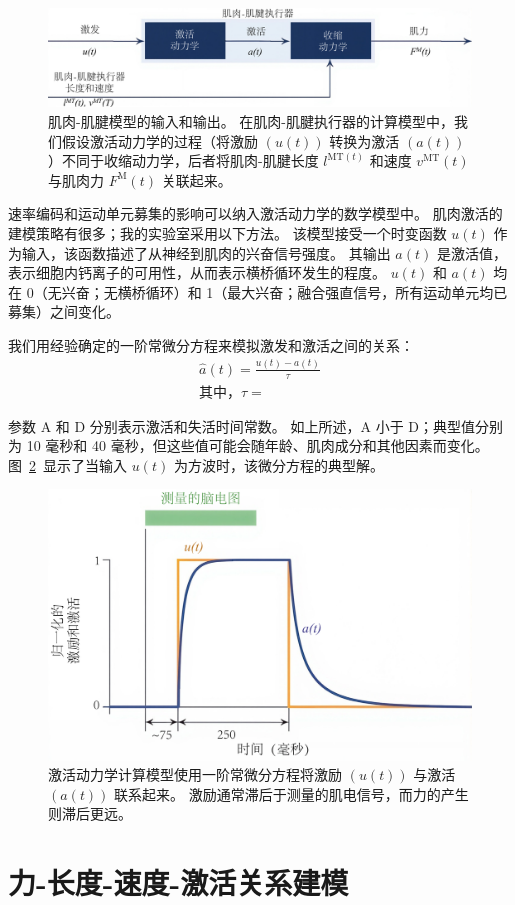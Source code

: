 \begin{figure}[!htb]
	\centering
	\includegraphics[width=1.0\linewidth]{chap4/4_15}
	\caption{肌肉-肌腱模型的输入和输出。
		在肌肉-肌腱执行器的计算模型中，我们假设激活动力学的过程（将激励 $(u(t))$  转换为激活 $(a(t))$）不同于收缩动力学，后者将肌肉-肌腱长度 $l^{\text{MT}(t)}$ 和速度 $v^{\text{MT}}(t)$ 与肌肉力 $F^{\text{M}}(t)$ 关联起来。 \label{fig:4_15}}
\end{figure}


速率编码和运动单元募集的影响可以纳入激活动力学的数学模型中。
肌肉激活的建模策略有很多；我的实验室采用以下方法。
该模型接受一个时变函数 $u(t)$ 作为输入，该函数描述了从神经到肌肉的兴奋信号强度。
其输出 $a(t)$ 是激活值，表示细胞内钙离子的可用性，从而表示横桥循环发生的程度。
$u(t)$ 和 $a(t)$ 均在 0（无兴奋；无横桥循环）和 1（最大兴奋；融合强直信号，所有运动单元均已募集）之间变化。


我们用经验确定的一阶常微分方程来模拟激发和激活之间的关系：
%
\begin{equation}
	\begin{aligned}
		\hat{a}(t) = \frac{u(t) - a(t)}{\tau} \\
		\text{其中，} \tau =
	\end{aligned}
\end{equation}


参数 A 和 D 分别表示激活和失活时间常数。
如上所述，A 小于 D；典型值分别为 10 毫秒和 40 毫秒，但这些值可能会随年龄、肌肉成分和其他因素而变化。
图~\ref{fig:4_16}~显示了当输入 $u(t)$ 为方波时，该微分方程的典型解。

\begin{figure}[!htb]
	\centering
	\includegraphics[width=1.0\linewidth]{chap4/4_16}
	\caption{激活动力学计算模型使用一阶常微分方程将激励 $(u(t))$ 与激活 $(a(t))$ 联系起来。
		激励通常滞后于测量的肌电信号，而力的产生则滞后更远。 \label{fig:4_16}}
\end{figure}


\section{力-长度-速度-激活关系建模}







